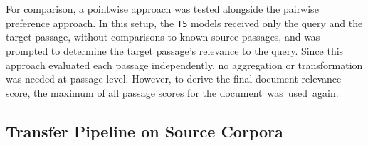 \\\\
For comparison, a pointwise approach was tested alongside the pairwise preference approach. In this setup, the \texttt{T5} models received only the query and the target passage, without comparisons to known source passages, and was prompted to determine the target passage's relevance to the query. Since this approach evaluated each passage independently, no aggregation or transformation was needed at passage level. However, to derive the final document relevance score, the maximum of all passage scores for the \mbox{document was used again}.

\subsection{Transfer Pipeline on Source Corpora}\label{eval-pairwise-preferences-source}

